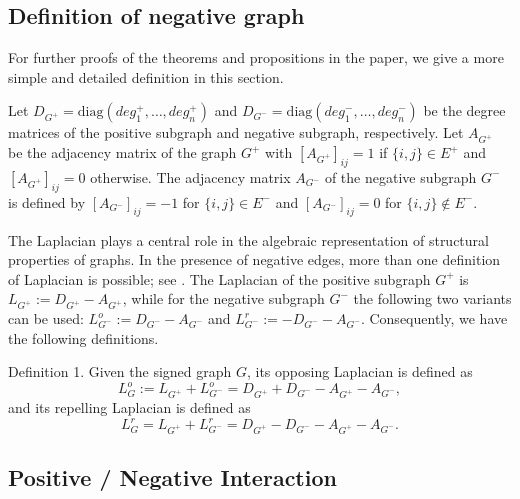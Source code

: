 
\subsection{Definition of negative graph}
\label{app_sec: negative graph}
For further proofs of the theorems and propositions in the paper, we give a more simple and detailed definition in this section.

Let \(D_{G^+} = \text{diag}(deg_1^+, \ldots, deg_n^+)\) and \(D_{G^-} = \text{diag}(deg_1^-, \ldots, deg_n^-)\) be the degree matrices of the positive subgraph and negative subgraph, respectively. 
%
Let \(A_{G^+}\) be the adjacency matrix of the graph \(G^+\) with \([A_{G^+}]_{ij} = 1\) if \(\{i, j\} \in E^+\) and \([A_{G^+}]_{ij} = 0\) otherwise. 
%
The adjacency matrix \(A_{G^-}\) of the negative subgraph \(G^-\) is defined by \([A_{G^-}]_{ij} = -1\)  for \(\{i, j\} \in E^-\) and \([A_{G^-}]_{ij} = 0\) for \(\{i, j\} \not\in E^-\).

The Laplacian plays a central role in the algebraic representation of structural properties of graphs. 
%
%
In the presence of negative edges, more than one definition of Laplacian is possible; see \cite{signed_dynamics_paper_review}. 
The Laplacian of the positive subgraph \(G^+\) is \(L_{G^+} := D_{G^+} - A_{G^+}\), while for the negative subgraph \(G^-\) the following two variants can be used: \(L_{G^-}^o := D_{G^-} - A_{G^-}\) and \(L_{G^-}^r := -D_{G^-} - A_{G^-}\). 
Consequently, we have the following definitions.

{Definition 1.} Given the signed graph \(G\), its opposing Laplacian is defined as
\begin{equation}
L_{G}^o := L_{G^+} + L_{G^-}^o = D_{G^+} + D_{G^-} - A_{G^+} - A_{G^-},
\end{equation}
and its repelling Laplacian is defined as
\begin{equation}
L_{G}^r = L_{G^+} + L_{G^-}^r = D_{G^+} - D_{G^-} - A_{G^+} - A_{G^-}.
\end{equation}


\subsection{Positive / Negative Interaction}

